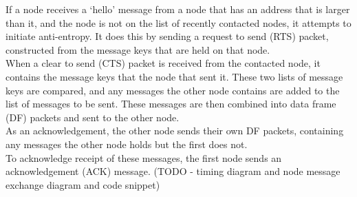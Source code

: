\documentclass[12pt,a4paper]{report}
\begin{document}
If a node receives a `hello' message from a node that has an address that is larger than it, and the node is not on the list of recently contacted nodes, it attempts to initiate anti-entropy. It does this by sending a request to send (RTS) packet, constructed from the message keys that are held on that node. \\ 
When a clear to send (CTS) packet is received from the contacted node, it contains the message keys that the node that sent it. These two lists of message keys are compared, and any messages the other node contains are added to the list of messages to be sent. These messages are then combined into data frame (DF) packets and sent to the other node. \\
As an acknowledgement, the other node sends their own DF packets, containing any messages the other node holds but the first does not. \\ 
To acknowledge receipt of these messages, the first node sends an acknowledgement (ACK) message. 
(TODO - timing diagram and node message exchange diagram and code snippet)






\end{document}
